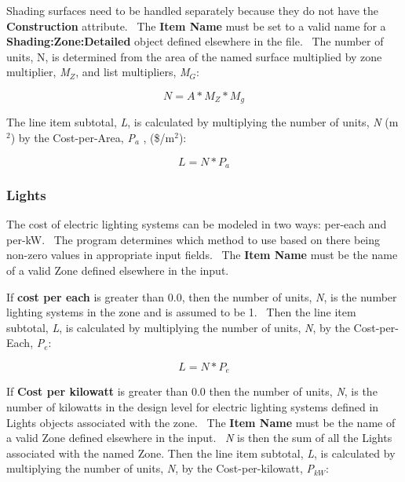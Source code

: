 Shading surfaces need to be handled separately because they do not have the \textbf{Construction} attribute.~ The \textbf{Item Name} must be set to a valid name for a \textbf{Shading:Zone:Detailed} object defined elsewhere in the file.~ The number of units, N, is determined from the area of the named surface multiplied by zone multiplier, \emph{M\(_{Z}\)}, and list multipliers, \emph{M\(_{G}\)}:

\begin{equation}
N = A*{M_Z} * {M_g}
\end{equation}

The line item subtotal, \emph{L}, is calculated by multiplying the number of units, \emph{N} (m\(^{2}\)) by the Cost-per-Area, \emph{P\(_{a}\)} , (\$/m\(^{2}\)):

\begin{equation}
L = N * {P_a}
\end{equation}

\subsubsection{Lights}\label{lights}

The cost of electric lighting systems can be modeled in two ways: per-each and per-kW.~ The program determines which method to use based on there being non-zero values in appropriate input fields.~ The \textbf{Item Name} must be the name of a valid Zone defined elsewhere in the input.

If \textbf{cost per each} is greater than 0.0, then the number of units, \emph{N}, is the number lighting systems in the zone and is assumed to be 1.~ Then the line item subtotal, \emph{L}, is calculated by multiplying the number of units, \emph{N}, by the Cost-per-Each, \emph{P\(_{e}\)}:

\begin{equation}
L = N * {P_e}
\end{equation}

If \textbf{Cost per kilowatt} is greater than 0.0 then the number of units, \emph{N}, is the number of kilowatts in the design level for electric lighting systems defined in Lights objects associated with the zone.~ The \textbf{Item Name} must be the name of a valid Zone defined elsewhere in the input.~ \emph{N} is then the sum of all the Lights associated with the named Zone. Then the line item subtotal, \emph{L}, is calculated by multiplying the number of units, \emph{N}, by the Cost-per-kilowatt, \emph{P\(_{kW}\)}:

